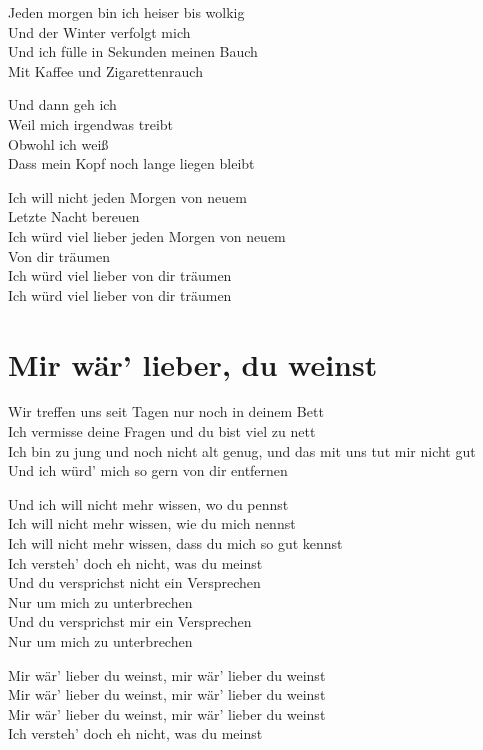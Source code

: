 \documentclass[]{book}
\begin{document}
Jeden morgen bin ich heiser bis wolkig\\
Und der Winter verfolgt mich\\
Und ich fülle in Sekunden meinen Bauch\\
Mit Kaffee und Zigarettenrauch

Und dann geh ich\\
Weil mich irgendwas treibt\\
Obwohl ich weiß\\
Dass mein Kopf noch lange liegen bleibt

Ich will nicht jeden Morgen von neuem\\
Letzte Nacht bereuen\\
Ich würd viel lieber jeden Morgen von neuem\\
Von dir träumen\\
Ich würd viel lieber von dir träumen\\
Ich würd viel lieber von dir träumen

\hypertarget{mir-war-lieber-du-weinst-1}{%
\section{Mir wär' lieber, du weinst}\label{mir-war-lieber-du-weinst-1}}

Wir treffen uns seit Tagen nur noch in deinem Bett\\
Ich vermisse deine Fragen und du bist viel zu nett\\
Ich bin zu jung und noch nicht alt genug, und das mit uns tut mir nicht gut\\
Und ich würd' mich so gern von dir entfernen

Und ich will nicht mehr wissen, wo du pennst\\
Ich will nicht mehr wissen, wie du mich nennst\\
Ich will nicht mehr wissen, dass du mich so gut kennst\\
Ich versteh' doch eh nicht, was du meinst\\
Und du versprichst nicht ein Versprechen\\
Nur um mich zu unterbrechen\\
Und du versprichst mir ein Versprechen\\
Nur um mich zu unterbrechen

Mir wär' lieber du weinst, mir wär' lieber du weinst\\
Mir wär' lieber du weinst, mir wär' lieber du weinst\\
Mir wär' lieber du weinst, mir wär' lieber du weinst\\
Ich versteh' doch eh nicht, was du meinst
\end{document}
